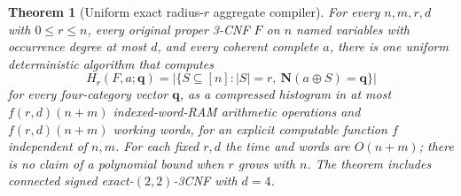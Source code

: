 \documentclass[11pt]{article}
\newtheorem{theorem}{Theorem}
\newcommand{\vv}[1]{\boldsymbol{#1}}
\begin{document}
\begin{theorem}[Uniform exact radius-$r$ aggregate compiler]\label{thm:main}
For every $n,m,r,d$ with $0\le r\le n$, every original proper 3-CNF $F$ on $n$ named variables with occurrence degree at most $d$, and every coherent complete $a$, there is one uniform deterministic algorithm that computes
\[H_r(F,a;\vv q)=|\{S\subseteq[n]:|S|=r,\ \vv N(a\oplus S)=\vv q\}|\]
for every four-category vector $\vv q$, as a compressed histogram in at most $f(r,d)(n+m)$ indexed-word-RAM arithmetic operations and $f(r,d)(n+m)$ working words, for an explicit computable function $f$ independent of $n,m$. For each fixed $r,d$ the time and words are $O(n+m)$; there is \emph{no claim} of a polynomial bound when $r$ grows with $n$. The theorem includes connected signed exact-$(2,2)$-3CNF with $d=4$.
\end{theorem}
\end{document}
